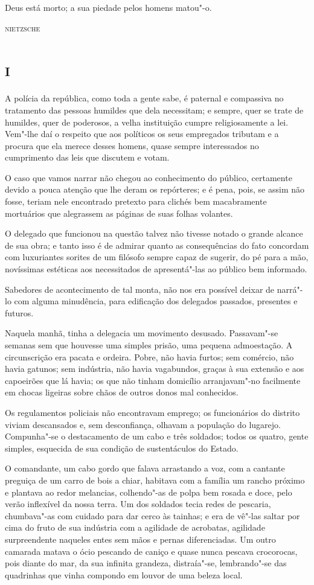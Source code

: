 \epigraph{Deus está morto; a sua piedade pelos homens matou"-o.}{\textsc{nietzsche}}

\section{\textsc{i}}

\noindent{}A polícia da república, como toda a gente sabe, é paternal e compassiva
no tratamento das pessoas humildes que dela necessitam; e sempre, quer
se trate de humildes, quer de poderosos, a velha instituição cumpre
religiosamente a lei. Vem"-lhe daí o respeito que aos políticos os seus
empregados tributam e a procura que ela merece desses homens, quase
sempre interessados no cumprimento das leis que discutem e votam.

O caso que vamos narrar não chegou ao conhecimento do público,
certamente devido a pouca atenção que lhe deram os repórteres; e é pena,
pois, se assim não fosse, teriam nele encontrado pretexto para clichés
bem macabramente mortuários que alegrassem as páginas de suas folhas
volantes.

O delegado que funcionou na questão talvez não tivesse notado o grande
alcance de sua obra; e tanto isso é de admirar quanto as consequências
do fato concordam com luxuriantes sorites de um filósofo sempre capaz de
sugerir, do pé para a mão, novíssimas estéticas aos necessitados de
apresentá"-las ao público bem informado.

Sabedores de acontecimento de tal monta, não nos era possível deixar de
narrá"-lo com alguma minudência, para edificação dos delegados passados,
presentes e futuros.

Naquela manhã, tinha a delegacia um movimento desusado. Passavam"-se
semanas sem que houvesse uma simples prisão, uma pequena admoestação. A
circunscrição era pacata e ordeira. Pobre, não havia furtos; sem
comércio, não havia gatunos; sem indústria, não havia vagabundos, graças
à sua extensão e aos capoeirões que lá havia; os que não tinham
domicílio arranjavam"-no facilmente em chocas ligeiras sobre chãos de
outros donos mal conhecidos.

Os regulamentos policiais não encontravam emprego; os funcionários do
distrito viviam descansados e, sem desconfiança, olhavam a população do
lugarejo. Compunha"-se o destacamento de um cabo e três soldados; todos
os quatro, gente simples, esquecida de sua condição de sustentáculos do
Estado.

O comandante, um cabo gordo que falava arrastando a voz, com a cantante
preguiça de um carro de bois a chiar, habitava com a família um rancho
próximo e plantava ao redor melancias, colhendo"-as de polpa bem rosada e
doce, pelo verão inflexível da nossa terra. Um dos soldados tecia redes
de pescaria, chumbava"-as com cuidado para dar cerco às tainhas; e era de
vê"-las saltar por cima do fruto de sua indústria com a agilidade de
acrobatas, agilidade surpreendente naqueles entes sem mãos e pernas
diferenciadas. Um outro camarada matava o ócio pescando de caniço e
quase nunca pescava crocorocas, pois diante do mar, da sua infinita
grandeza, distraía"-se, lembrando"-se das quadrinhas que vinha compondo em
louvor de uma beleza local.

